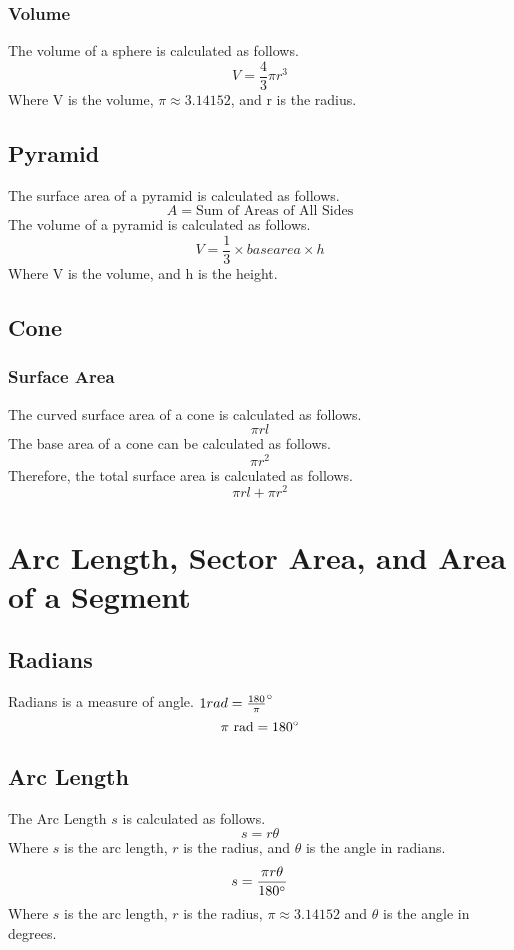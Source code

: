 \documentclass{report}
\begin{document}
\begin{flushleft}
\subsubsection{Volume}
The volume of a sphere is calculated as follows.
\begin{equation}
V=\frac{4}{3}\pi r^3
\end{equation}
Where V is the volume, $\pi \approx 3.14152$, and r is the radius.

\subsection{Pyramid}
The surface area of a pyramid is calculated as follows.
\begin{equation}
A = \text{Sum of Areas of All Sides}
\end{equation}
The volume of a pyramid is calculated as follows.
\begin{equation}
V=\frac{1}{3}\times base area \times h
\end{equation}
Where V is the volume, and h is the height.

\subsection{Cone}
\subsubsection{Surface Area}
The curved surface area of a cone is calculated as follows.
\[
\pi r l
\]
The base area of a cone can be calculated as follows.
\[
\pi r^2
\]
Therefore, the total surface area is calculated as follows.
\begin{equation}
\pi r l + \pi r^2
\end{equation}

\section{Arc Length, Sector Area, and Area of a Segment}
\subsection{Radians}
Radians is a measure of angle. $1 rad = \frac{180}{\pi}\degree$
\[
\pi \text{ rad} = 180\degree
\]

\subsection{Arc Length}
The Arc Length $s$ is calculated as follows.
\begin{equation}
s = r\theta
\end{equation}
Where $s$ is the arc length, $r$ is the radius, and $\theta$ is the angle in radians.
\begin{equation}
s = \frac{\pi r \theta}{180\degree}
\end{equation}
Where $s$ is the arc length, $r$ is the radius, $\pi \approx 3.14152$ and $\theta$ is the angle in degrees.


\end{flushleft}
\end{document}
